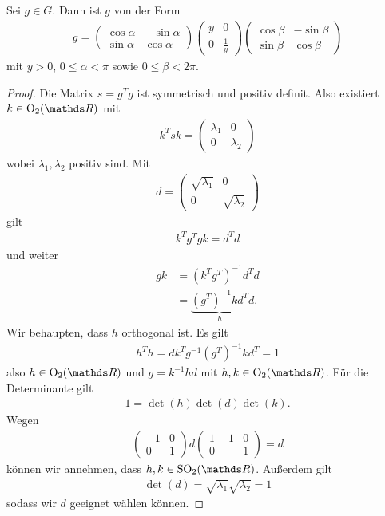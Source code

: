 \begin{prop}
Sei $g \in G$. Dann ist $g$ von der Form
\begin{align*}
g=\begin{pmatrix}
\cos \alpha&-\sin\alpha\\
\sin  \alpha&\cos \alpha
\end{pmatrix} \begin{pmatrix}
y&0\\
0&\frac{1}{y}
\end{pmatrix}
\begin{pmatrix}
\cos\beta&-\sin\beta\\
\sin\beta&\cos\beta
\end{pmatrix}
\end{align*}
mit $y>0$, $0\leq \alpha<\pi$ sowie $0\leq \beta <2\pi$.
\end{prop}
\begin{proof}
Die Matrix $s=g^Tg$ ist symmetrisch und positiv definit.
Also existiert $k \in \Oo_2(\R)$ mit
\begin{align*}
k^Tsk=\begin{pmatrix}
\lambda_1&0\\
0&\lambda_2
\end{pmatrix}
\end{align*}
wobei $\lambda_1,\lambda_2$ positiv sind.
Mit
\begin{align*}
d=\begin{pmatrix}
\sqrt{\lambda_1}&0\\
0&\sqrt{\lambda_2}
\end{pmatrix}
\end{align*}
gilt
\begin{align*}
k^Tg^Tgk=d^Td
\end{align*}
und weiter
\begin{align*}
gk&=(k^Tg^T)^{-1} d^Td\\
&=\underbrace{(g^T)^{-1}kd^T}_{h} d.
\end{align*}
Wir behaupten, dass $h$ orthogonal ist. Es gilt
\begin{align*}
h^T h=dk^T g^{-1} (g^{T})^{-1} kd^T=1
\end{align*}
also $h \in \Oo_2(\R)$ und $g=k^{-1}hd$
mit $h,k\in \Oo_2(\R)$.
Für die Determinante gilt
\begin{align*}
1=\det(h)\det(d)\det(k).
\end{align*}
Wegen
\begin{align*}
\begin{pmatrix}
-1&0\\
0&1
\end{pmatrix} d
\begin{pmatrix}1
-1&0\\
0&1
\end{pmatrix}=d
\end{align*}
können wir annehmen, dass $h,k \in \SO_2(\R)$.
Außerdem gilt
\begin{align*}
\det(d)=\sqrt{\lambda_1}\sqrt{\lambda_2}=1
\end{align*}
sodass wir $d$ geeignet wählen können.
\end{proof}

